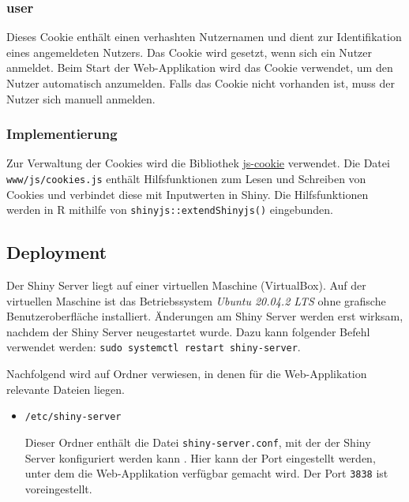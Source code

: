 \documentclass[
]{article}
\begin{document}
\hypertarget{user-1}{%
\subsubsection{user}\label{user-1}}

Dieses Cookie enthält einen verhashten Nutzernamen und dient zur Identifikation eines angemeldeten Nutzers. Das Cookie wird gesetzt, wenn sich ein Nutzer anmeldet. Beim Start der Web-Applikation wird das Cookie verwendet, um den Nutzer automatisch anzumelden. Falls das Cookie nicht vorhanden ist, muss der Nutzer sich manuell anmelden.

\hypertarget{implementierung}{%
\subsubsection{Implementierung}\label{implementierung}}

Zur Verwaltung der Cookies wird die Bibliothek \href{https://github.com/js-cookie/js-cookie}{js-cookie} \autocite{js-cookie} verwendet. Die Datei \texttt{www/js/cookies.js} enthält Hilfsfunktionen zum Lesen und Schreiben von Cookies und verbindet diese mit Inputwerten in Shiny. Die Hilfsfunktionen werden in R mithilfe von \texttt{shinyjs::extendShinyjs()} eingebunden.

\hypertarget{deployment-1}{%
\subsection{Deployment}\label{deployment-1}}

Der Shiny Server liegt auf einer virtuellen Maschine (VirtualBox). Auf der virtuellen Maschine ist das Betriebssystem \emph{Ubuntu 20.04.2 LTS} ohne grafische Benutzeroberfläche installiert. Änderungen am Shiny Server werden erst wirksam, nachdem der Shiny Server neugestartet wurde. Dazu kann folgender Befehl verwendet werden: \texttt{sudo\ systemctl\ restart\ shiny-server}.

Nachfolgend wird auf Ordner verwiesen, in denen für die Web-Applikation relevante Dateien liegen.

\begin{itemize}
\item
  \texttt{/etc/shiny-server}

  Dieser Ordner enthält die Datei \texttt{shiny-server.conf}, mit der der Shiny Server konfiguriert werden kann \autocite{shiny-server}. Hier kann der Port eingestellt werden, unter dem die Web-Applikation verfügbar gemacht wird. Der Port \texttt{3838} ist voreingestellt.
\end{itemize}
\end{document}
